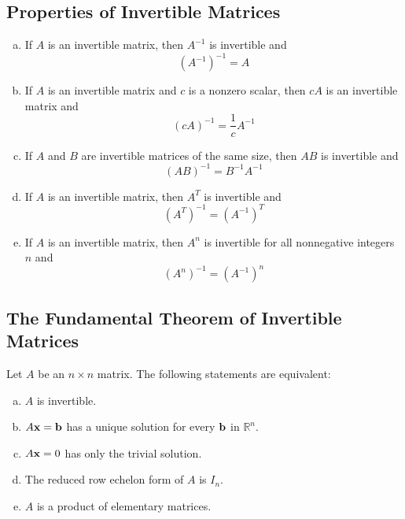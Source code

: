 \subsection*{Properties of Invertible Matrices}
\begin{enumerate}[(a)]
    \item If $A$ is an invertible matrix, then $A^{-1}$ is invertible and \[(A^{-1})^{-1}=A\]
    \item If $A$ is an invertible matrix and $c$ is a nonzero scalar, then $cA$ is an invertible matrix and \[(cA)^{-1}=\frac{1}{c}A^{-1}\]
    \item If $A$ and $B$ are invertible matrices of the same size, then $AB$ is invertible and \[(AB)^{-1}=B^{-1}A^{-1}\]
    \item If $A$ is an invertible matrix, then $A^T$ is invertible and \[(A^T)^{-1}=(A^{-1})^T\]
    \item If $A$ is an invertible matrix, then $A^n$ is invertible for all nonnegative integers $n$ and \[(A^n)^{-1}=(A^{-1})^n\]
\end{enumerate}

\subsection*{The Fundamental Theorem of Invertible Matrices}
Let $A$ be an $n\times n$ matrix. The following statements are equivalent:
\begin{enumerate}[(a)]
    \item $A$ is invertible.
    \item $A\mathbf{x}=\mathbf{b}$ has a unique solution for every $\mathbf{b}$ in $\mathbb{R}^n$.
    \item $A\mathbf{x}=0$ has only the trivial solution.
    \item The reduced row echelon form of $A$ is $I_n$.
    \item $A$ is a product of elementary matrices.
\end{enumerate}


